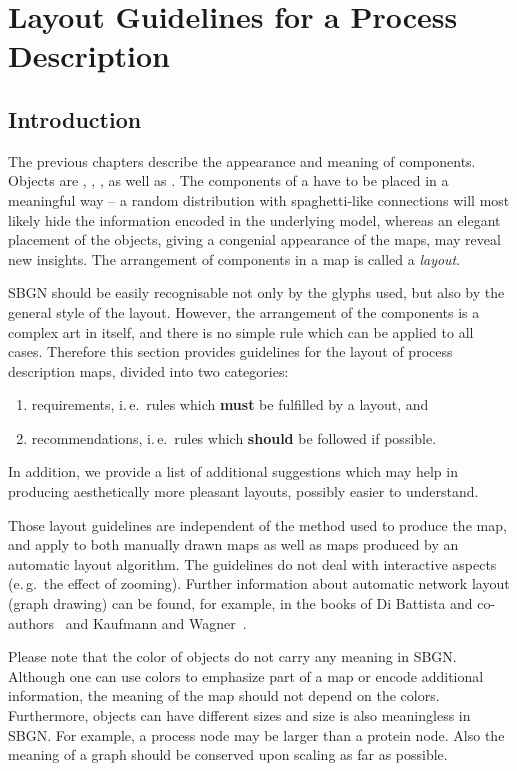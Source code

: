 	\chapter{Layout Guidelines for a Process Description}
\label{chp:layout}

\section{Introduction}

The previous chapters describe the appearance and meaning of
\SBGNPDLone components. Objects are , , 
,  as well as . The components of a \PD
have to be placed in a meaningful way -- a random
distribution with spaghetti-like connections will most likely hide
the information encoded in the underlying model, whereas an elegant
placement of the objects, giving a congenial appearance of the
maps, may reveal new insights. The arrangement of components in a
map is called a \emph{layout}.

SBGN \PDs should be easily recognisable not only by the
glyphs used, but also by the general style of the layout. However, the
arrangement of the components is a complex art in itself, and there is
no simple rule which can be applied to all cases. Therefore this
section provides guidelines for the layout of process description maps, divided
into two categories:
\begin{enumerate}
  \item requirements, i.\,e.~rules which \textbf{must} be fulfilled by a
  layout, and
  \item recommendations, i.\,e.~rules which \textbf{should} be followed if
  possible. 
\end{enumerate}
In addition, we provide a list of additional suggestions which may help in producing aesthetically more pleasant layouts, possibly easier to understand.

Those layout guidelines are independent of the method used to produce
the map, and apply to both manually drawn maps as well as
maps produced by an automatic layout algorithm. The guidelines do
not deal with interactive aspects (e.\,g.~the effect of zooming). Further information about automatic network layout
(graph drawing) can be found, for example, in the books of Di Battista and
co-authors~\cite{DiBattista:1998} and Kaufmann and Wagner~\cite{Kaufmann:2001}.

Please note that the color of objects do not carry any meaning in
SBGN. Although one can use colors to emphasize part of a map or
encode additional information, the meaning of the map should not
depend on the colors. Furthermore, objects can have different sizes
and size is also meaningless in SBGN. For example, a process node
may be larger than a protein node. Also the meaning of a graph
should be conserved upon scaling as far as possible.


